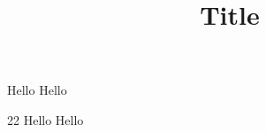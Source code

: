 \documentclass{article}
\title{Title}
\begin{document}
{\color{white}
\colorbox{myundgreen}{Hello \qquad \Huge Hello}}\par
\textcolor{myundorange}{22 Hello \qquad \Huge Hello}\par

\end{document}
